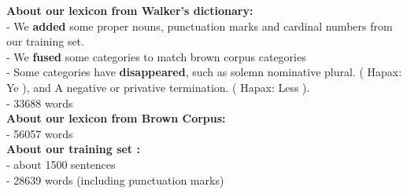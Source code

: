 \begin{center}
\textbf{ About our lexicon from Walker's dictionary:}\\[1mm]
	
- We \textbf{added} some proper nouns, punctuation marks and cardinal numbers from our training set.\\
- We \textbf{fused} some categories to match brown corpus categories\\
- Some categories have \textbf{disappeared}, such as solemn nominative plural. ( Hapax: Ye ), and A negative or privative termination. ( Hapax: Less ).\\
- 33688 words\\[2mm]

\textbf{About our lexicon from Brown Corpus:}\\[1mm]

- 56057 words\\[2mm]

\textbf{About our training set :}\\[1mm]
- about 1500 sentences\\
- 28639 words (including punctuation marks)

\end{center}
